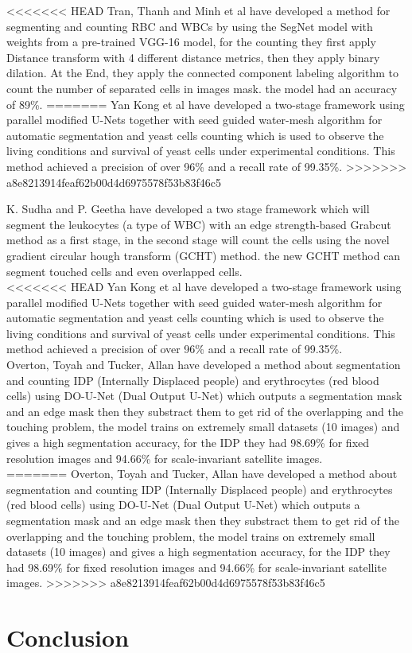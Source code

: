 <<<<<<< HEAD
Tran, Thanh and Minh et al \textsuperscript{\cite{DBLP:journals/corr/abs-1802-10548}} have developed a method for segmenting and counting RBC and WBCs by using the SegNet model with weights from a pre-trained VGG-16 model, for the counting they first apply Distance transform with 4 different distance metrics, then they apply binary dilation. At the End, they apply the connected component labeling algorithm to count the number of separated cells in images mask. the model had an accuracy of 89\%.
=======
Yan Kong et al \textsuperscript{\cite{Kong:20}} have developed a two-stage framework using parallel modified U-Nets together with seed guided water-mesh algorithm for automatic segmentation and yeast cells counting which is used to observe the living conditions and survival of yeast cells under experimental conditions. This method achieved a precision of over 96\% and a recall rate of 99.35\%.
>>>>>>> a8e8213914feaf62b00d4d6975578f53b83f46c5

\newpage

K. Sudha and P. Geetha \textsuperscript{\cite{SUDHA2020639}} have developed a two stage framework which will segment the leukocytes (a type of WBC) with an edge strength-based Grabcut method as a first stage, in the second stage will count the cells using the novel gradient circular hough transform (GCHT) method. the new GCHT method can segment touched cells and even overlapped cells.\\

<<<<<<< HEAD
Yan Kong et al \textsuperscript{\cite{Kong:20}} have developed a two-stage framework using parallel modified U-Nets together with seed guided water-mesh algorithm for automatic segmentation and yeast cells counting which is used to observe the living conditions and survival of yeast cells under experimental conditions. This method achieved a precision of over 96\% and a recall rate of 99.35\%.\\

Overton, Toyah and Tucker, Allan \textsuperscript{\cite{10.1007/978-3-030-44584-3_31}} have developed a method about segmentation and counting IDP (Internally Displaced people) and erythrocytes (red blood cells) using DO-U-Net (Dual Output U-Net) which outputs a segmentation mask and an edge mask then they substract them to get rid of the overlapping and the touching problem, the model trains on extremely small datasets (10 images) and gives a high segmentation accuracy, for the IDP they had 98.69\% for fixed resolution images and 94.66\% for scale-invariant satellite images.\\
=======
Overton, Toyah and Tucker, Allan \textsuperscript{\cite{10.1007/978-3-030-44584-3_31}} have developed a method about segmentation and counting IDP (Internally Displaced people) and erythrocytes (red blood cells) using DO-U-Net (Dual Output U-Net) which outputs a segmentation mask and an edge mask then they substract them to get rid of the overlapping and the touching problem, the model trains on extremely small datasets (10 images) and gives a high segmentation accuracy, for the IDP they had 98.69\% for fixed resolution images and 94.66\% for scale-invariant satellite images.
>>>>>>> a8e8213914feaf62b00d4d6975578f53b83f46c5

\section{Conclusion}
\vspace{0.1in}
\hspace*{0.16in}
